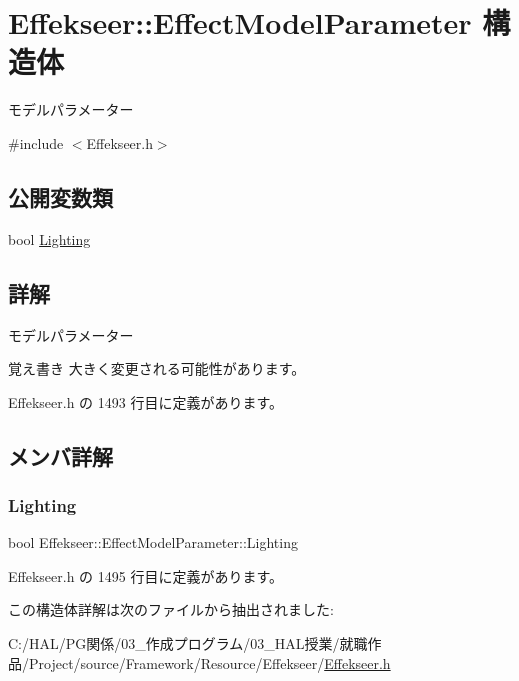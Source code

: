 \hypertarget{struct_effekseer_1_1_effect_model_parameter}{}\section{Effekseer\+:\+:Effect\+Model\+Parameter 構造体}
\label{struct_effekseer_1_1_effect_model_parameter}


モデルパラメーター  




{\ttfamily \#include $<$Effekseer.\+h$>$}

\subsection*{公開変数類}
\begin{DoxyCompactItemize}
\item 
bool \mbox{\hyperlink{struct_effekseer_1_1_effect_model_parameter_a643065cc16447ee7cccacc4a3279da06}{Lighting}}
\end{DoxyCompactItemize}


\subsection{詳解}
モデルパラメーター 

\begin{DoxyNote}{覚え書き}
大きく変更される可能性があります。 
\end{DoxyNote}


 Effekseer.\+h の 1493 行目に定義があります。



\subsection{メンバ詳解}
\mbox{\label{struct_effekseer_1_1_effect_model_parameter_a643065cc16447ee7cccacc4a3279da06}} 
\subsubsection{\texorpdfstring{Lighting}{Lighting}}
{\footnotesize\ttfamily bool Effekseer\+::\+Effect\+Model\+Parameter\+::\+Lighting}



 Effekseer.\+h の 1495 行目に定義があります。



この構造体詳解は次のファイルから抽出されました\+:\begin{DoxyCompactItemize}
\item 
C\+:/\+H\+A\+L/\+P\+G関係/03\+\_\+作成プログラム/03\+\_\+\+H\+A\+L授業/就職作品/\+Project/source/\+Framework/\+Resource/\+Effekseer/\mbox{\hyperlink{_effekseer_8h}{Effekseer.\+h}}\end{DoxyCompactItemize}
